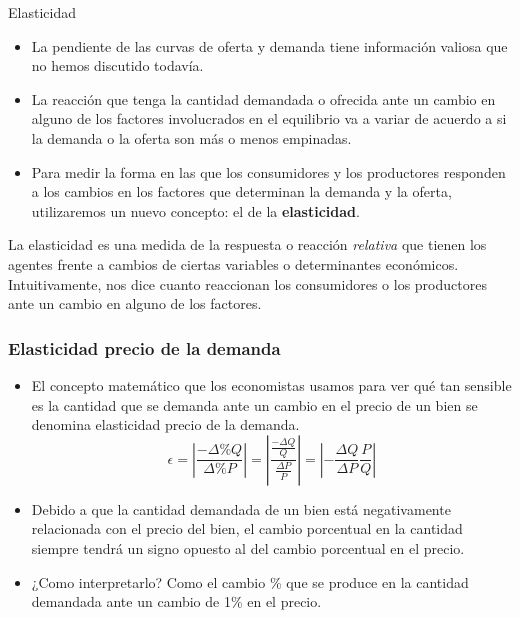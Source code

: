 \documentclass{beamer}
\begin{document}
\begin{frame}{Elasticidad}

  \begin{itemize}
    \item La pendiente de las curvas de oferta y demanda tiene información valiosa que no hemos discutido todavía.
    \item La reacción que tenga la cantidad demandada o ofrecida ante un cambio en alguno de los factores involucrados en el equilibrio va a variar de acuerdo a si la demanda o la oferta son más o menos empinadas.
    \item Para medir la forma en las que los consumidores y los productores responden a los cambios en los factores que determinan la demanda y la oferta, utilizaremos un nuevo concepto: el de la \textbf{elasticidad}. 
  \end{itemize}
  \begin{boxA}
    \centering
    La elasticidad es una medida de la respuesta o reacción \textit{relativa} que tienen los agentes frente a cambios de ciertas variables o determinantes económicos. Intuitivamente, nos dice cuanto reaccionan los consumidores o los productores ante un cambio en alguno de los factores.
  \end{boxA}
\end{frame}

\begin{frame}
\frametitle{Elasticidad precio de la demanda}
\begin{itemize}
    \item El concepto matemático que los economistas usamos para ver qué tan sensible es la cantidad que se demanda ante un cambio en el precio de un bien se denomina elasticidad precio de la demanda.
    \begin{equation*}
        \epsilon = \left|\frac{- \Delta \% Q}{\Delta \% P}\right| = \left|\frac{\frac{- \Delta Q}{Q}}{\frac{\Delta P}{P}}\right| = \left|-\frac{\Delta Q}{\Delta P} \frac{P}{Q}\right|
    \end{equation*}
    \item Debido a que la cantidad demandada de un bien está negativamente relacionada con el precio del bien, el cambio porcentual en la cantidad siempre tendrá un signo opuesto al del cambio porcentual en el precio.
    \item ¿Como interpretarlo? Como el cambio \% que se produce en la cantidad demandada ante un cambio de 1\% en el precio.
    \end{itemize}
\end{frame}
\end{document}
